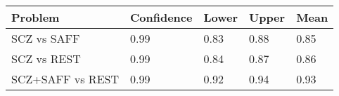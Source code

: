 \begin{tabular}{L{.65in}|L{.5in}|L{.5in}|L{.5in}|L{.5in}}\hline
 Problem & Confidence & Lower & Upper & Mean \\\hline
SCZ vs SAFF&0.99&0.83&0.88&0.85\\\hline
SCZ vs REST&0.99&0.84&0.87&0.86\\\hline
SCZ+SAFF vs REST&0.99&0.92&0.94&0.93\\\hline
\end{tabular}
